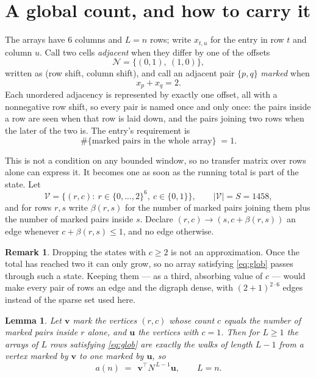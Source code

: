 \documentclass[11pt,a4paper]{article}
\theoremstyle{plain}
\newtheorem{lemma}[theorem]{Lemma}
\theoremstyle{definition}
\newtheorem{remark}[theorem]{Remark}
\begin{document}
\section{A global count, and how to carry it}

The arrays have $6$ columns and $L=n$ rows; write $x_{t,u}$ for the entry in
row $t$ and column $u$. Call two cells \emph{adjacent} when they differ by one of the
offsets
\[
\mathcal N=\{(0,1),\ (1,0)\},
\]
written as (row shift, column shift), and call an adjacent pair $\{p,q\}$
\emph{marked} when
\[
x_{p}+x_{q}=2 .
\]
Each unordered adjacency is represented by exactly one offset, all with a nonnegative row
shift, so every pair is named once and only once: the pairs inside a row are seen when
that row is laid down, and the pairs joining two rows when the later of the two is. The
entry's requirement is
\begin{equation}\label{eq:glob}
\#\{\text{marked pairs in the whole array}\}\;=1.
\end{equation}

This is not a condition on any bounded window, so no transfer matrix over rows alone can
express it. It becomes one as soon as the running total is part of the state. Let
\[
\mathcal V=\bigl\{(r,c):\ r\in\{0,\dots,2\}^{6},\ c\in\{0,1\}\bigr\},
\qquad |\mathcal V|=S=1458,
\]
and for rows $r,s$ write $\beta(r,s)$ for the number of marked pairs joining them plus the
number of marked pairs inside $s$. Declare $(r,c)\to(s,c+\beta(r,s))$ an edge whenever
$c+\beta(r,s)\le1$, and no edge otherwise.

\begin{remark}
Dropping the states with $c\ge2$ is not an approximation. Once the total has reached two it
can only grow, so no array satisfying \eqref{eq:glob} passes through such a state. Keeping
them --- as a third, absorbing value of $c$ --- would make every pair of rows an edge and
the digraph dense, with $(2+1)^{2\cdot6}$ edges instead of the sparse set used here.
\end{remark}

\begin{lemma}\label{lem:walk}
Let $\mathbf{v}$ mark the vertices $(r,c)$ whose count $c$ equals the number of marked pairs
inside $r$ alone, and $\mathbf{u}$ the vertices with $c=1$. Then for $L\ge1$ the arrays
of $L$ rows satisfying \eqref{eq:glob} are exactly the walks of length $L-1$ from a
vertex marked by $\mathbf{v}$ to one marked by $\mathbf{u}$, so
\[
a(n)\;=\;\,\mathbf{v}^{\!\top}N^{\,L-1}\mathbf{u},\qquad L=n .
\]
\end{lemma}
\end{document}
